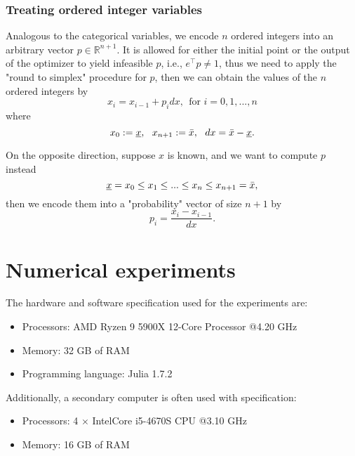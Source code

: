 \documentclass[12pt]{article}
\begin{document}
\subsubsection{Treating ordered integer variables}
\label{sec:hyperopt_oint}
Analogous to the categorical variables, we encode $n$ ordered integers into an arbitrary vector $p \in \mathbb{R}^{n+1}$. 
It is allowed for either the initial point or the output of the optimizer to yield infeasible $p$, i.e., $e^\top p \neq 1$, thus we need to apply the "round to simplex" procedure for $p$, then we can obtain the values of the $n$ ordered integers by
\begin{equation*}
	x_i = x_{i-1} + p_idx, ~~ \text{for }i=0,1,...,n
\end{equation*}
where
\begin{equation}
	x_0 := \underbar{$x$}, ~~ x_{n+1} := \bar{x}, ~~ dx = \bar{x} - \underbar{$x$}.
\end{equation}

On the opposite direction, suppose $x$ is known, and we want to compute $p$ instead
\begin{equation*}
	\underbar{$x$} = x_0 \leq x_1 \leq ... \leq x_n \leq x_{n+1} = \bar{x},
\end{equation*}
then we encode them into a "probability" vector of size $n+1$ by
\begin{equation*}
	p_i = \frac{x_i - x_{i-1}}{dx}.
\end{equation*}


\section{Numerical experiments}
The hardware and software specification used for the experiments are:
\begin{itemize}
	\item Processors: AMD Ryzen 9 5900X 12-Core Processor @4.20 GHz
	\item Memory: 32 GB of RAM
	\item Programming language: Julia 1.7.2
\end{itemize}
Additionally, a secondary computer is often used with specification:
\begin{itemize}
	\item Processors: 4 $\times$ Intel\textregistered Core i5-4670S CPU @3.10 GHz
	\item Memory: 16 GB of RAM
\end{itemize}
\end{document}
